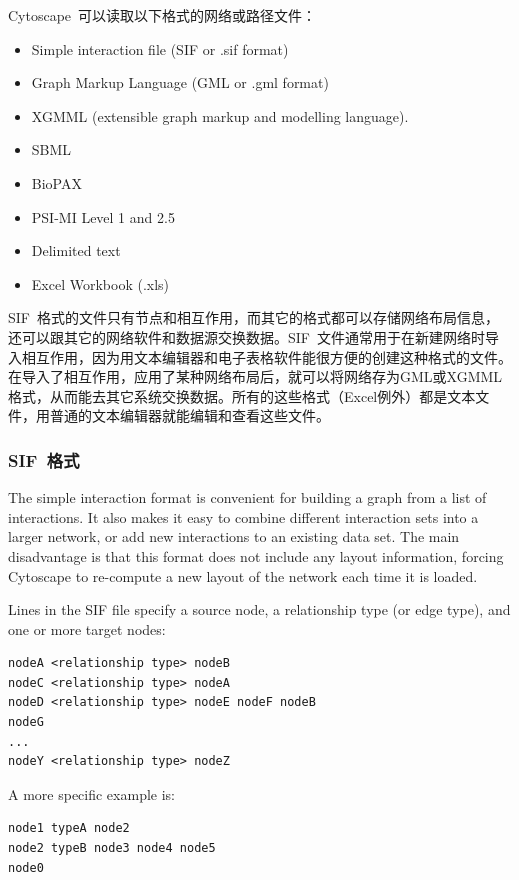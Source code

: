 Cytoscape~可以读取以下格式的网络或路径文件：
\begin{itemize}
\item Simple interaction file (SIF or .sif format) 
\item Graph Markup Language (GML or .gml format) 
\item XGMML (extensible graph markup and modelling language). 
\item SBML 
\item BioPAX 
\item PSI-MI Level 1 and 2.5 
\item Delimited text 
\item Excel Workbook (.xls) 
\end{itemize}

SIF~格式的文件只有节点和相互作用，而其它的格式都可以存储网络布局信息，还可以跟其它的网络软件和数据源交换数据。SIF~文件通常用于在新建网络时导入相互作用，因为用文本编辑器和电子表格软件能很方便的创建这种格式的文件。在导入了相互作用，应用了某种网络布局后，就可以将网络存为GML或XGMML格式，从而能去其它系统交换数据。所有的这些格式（Excel例外）都是文本文件，用普通的文本编辑器就能编辑和查看这些文件。


 \subsubsection{SIF~格式}
 The simple interaction format is convenient for building a graph from a list of interactions. It also makes it easy to combine different interaction sets into a larger network, or add new interactions to an existing data set. The main disadvantage is that this format does not include any layout information, forcing Cytoscape to re-compute a new layout of the network each time it is loaded. 

 Lines in the SIF file specify a source node, a relationship type (or edge type), and one or more target nodes: 

 \begin{verbatim}
nodeA <relationship type> nodeB
nodeC <relationship type> nodeA
nodeD <relationship type> nodeE nodeF nodeB
nodeG
...
nodeY <relationship type> nodeZ
\end{verbatim}



 A more specific example is: 


 \begin{verbatim}
node1 typeA node2
node2 typeB node3 node4 node5
node0

\end{verbatim}



